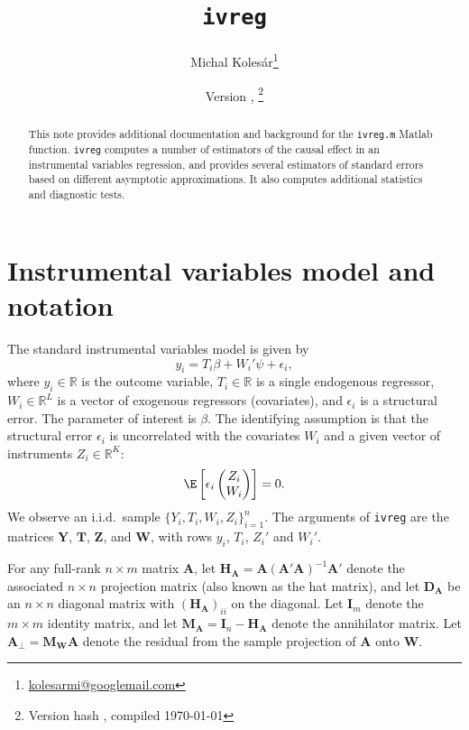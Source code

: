 \documentclass{mynotes}
\title{\texttt{ivreg}}%
\author{Michal
  Kolesár\thanks{\href{mailto:kolesarmi@googlemail.com}{kolesarmi@googlemail.com}}}%
\date{Version \gitTag, \gitDate\thanks{Version hash \gitHash, compiled \today
   }}%
\newcommand{\by}{\mathbf{Y}} %
\newcommand{\bt}{\mathbf{T}} %
\newcommand{\bz}{\mathbf{Z}} %
\newcommand{\bw}{\mathbf{W}} %
\newcommand{\eye}{\mathbf{I}} %
\newcommand{\Hm}[1]{\mathbf{H}_{#1}} %
\newcommand{\Dm}[1]{\mathbf{D}_{#1}} %
\newcommand{\Mm}[1]{\mathbf{M}_{#1}} %
\begin{document}
\maketitle

\begin{abstract}
  This note provides additional documentation and background for the
  \lstinline!ivreg.m! Matlab function. \lstinline!ivreg! computes a number of
  estimators of the causal effect in an instrumental variables regression, and
  provides several estimators of standard errors based on different asymptotic
  approximations. It also computes additional statistics and diagnostic tests.
\end{abstract}


\section{Instrumental variables model and notation}
The standard instrumental variables model is given by
\begin{equation}\label{eq:1}
  y_{i}=T_{i}\beta+W_{i}'\psi+\epsilon_{i},
\end{equation}
where $y_{i}\in\mathbb{R}$ is the outcome variable, $T_{i}\in\mathbb{R}$ is a
single endogenous regressor, $W_{i}\in\mathbb{R}^{L}$ is a vector of exogenous
regressors (covariates), and $\epsilon_{i}$ is a structural error. The parameter
of interest is $\beta$. The identifying assumption is that the structural error
$\epsilon_{i}$ is uncorrelated with the covariates $W_{i}$ and a given vector of
instruments $Z_{i}\in\mathbb{R}^{K}$:
\begin{equation}
  \label{eq:id}
  \E\left[\epsilon_{i}
    \begin{pmatrix}
      Z_{i}\\W_{i}
    \end{pmatrix}\right]
  =0.
\end{equation}
We observe an i.i.d.~sample $\{Y_{i},T_{i},W_{i},Z_{i}\}_{i=1}^{n}$. The
arguments of \lstinline!ivreg! are the matrices $\by$, $\bt$, $\bz$, and $\bw$,
with rows $y_{i}$, $T_{i}$, $Z_{i}'$ and $W_{i}'$.

For any full-rank $n\times m$ matrix $\mathbf{A}$, let
$\Hm{\mathbf{A}}=\mathbf{A}(\mathbf{A}'\mathbf{A})^{-1}\mathbf{A}'$ denote the
associated $n\times n$ projection matrix (also known as the hat matrix), and let
$\Dm{\mathbf{A}}$ be an $n\times n$ diagonal matrix with
$(\Hm{\mathbf{A}})_{ii}$ on the diagonal. Let $\eye_{m}$ denote the $m\times m$
identity matrix, and let $\Mm{\mathbf{A}}=\eye_{n}-\Hm{\mathbf{A}}$ denote the
annihilator matrix. Let $\mathbf{A}_{\perp}=\Mm{\bw}\mathbf{A}$ denote the
residual from the sample projection of $\mathbf{A}$ onto $\bw$.
\end{document}
